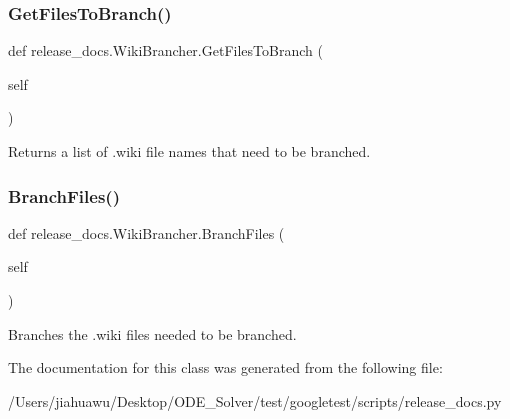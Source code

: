 \subsubsection{\texorpdfstring{Get\+Files\+To\+Branch()}{GetFilesToBranch()}}
{\footnotesize\ttfamily def release\+\_\+docs.\+Wiki\+Brancher.\+Get\+Files\+To\+Branch (\begin{DoxyParamCaption}\item[{}]{self }\end{DoxyParamCaption})}

\begin{DoxyVerb}Returns a list of .wiki file names that need to be branched.\end{DoxyVerb}
 \mbox{\label{classrelease__docs_1_1_wiki_brancher_a5ef284f7e1742f465ecd0c14d2667327}} 
\subsubsection{\texorpdfstring{Branch\+Files()}{BranchFiles()}}
{\footnotesize\ttfamily def release\+\_\+docs.\+Wiki\+Brancher.\+Branch\+Files (\begin{DoxyParamCaption}\item[{}]{self }\end{DoxyParamCaption})}

\begin{DoxyVerb}Branches the .wiki files needed to be branched.\end{DoxyVerb}
 

The documentation for this class was generated from the following file\+:\begin{DoxyCompactItemize}
\item 
/\+Users/jiahuawu/\+Desktop/\+O\+D\+E\+\_\+\+Solver/test/googletest/scripts/release\+\_\+docs.\+py\end{DoxyCompactItemize}
